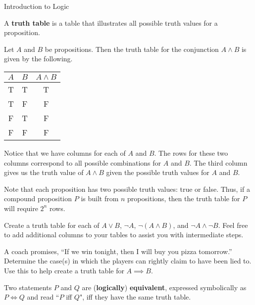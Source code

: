\begin{section}{Introduction to Logic}
\begin{definition}
A \textbf{truth table} is a table that illustrates all possible truth values for a proposition.  
\end{definition}

\begin{example}
Let $A$ and $B$ be propositions.  Then the truth table for the conjunction $A\wedge B$ is given by the following.
\begin{center}
\begin{tabular}{@{}ccc@{}}
\toprule
$A$  &  $B$ & $A \wedge B$  \\
\midrule
T & T & T  \\ 
T & F & F  \\ 
F & T & F  \\ 
F & F & F  \\
\bottomrule
\end{tabular}
\end{center}
Notice that we have columns for each of $A$ and $B$.  The rows for these two columns correspond to all possible combinations for $A$ and $B$.  The third column gives us the truth value of $A\wedge B$ given the possible truth values for $A$ and $B$.
\end{example}

Note that each proposition has two possible truth values: true or false. Thus, if a compound proposition $P$ is built from $n$ propositions, then the truth table for $P$ will require $2^n$ rows.

\begin{exercise}
Create a truth table for each of $A \vee B$, $\neg A$, $\neg (A \wedge B)$, and $\neg A \wedge \neg B$.  Feel free to add additional columns to your tables to assist you with intermediate steps.
\end{exercise}

\begin{problem}
A coach promises, ``If we win tonight, then I will buy you pizza tomorrow.''  Determine the case(s) in which the players can rightly claim to have been lied to. Use this to help create a truth table for $A \implies B$.
\end{problem}

\begin{definition}
Two statements $P$ and $Q$ are (\textbf{logically}) \textbf{equivalent}, expressed symbolically as $\boxed{P\iff Q}$ and read ``$P$ iff $Q$", iff they have the same truth table.
\end{definition}


\end{section}
